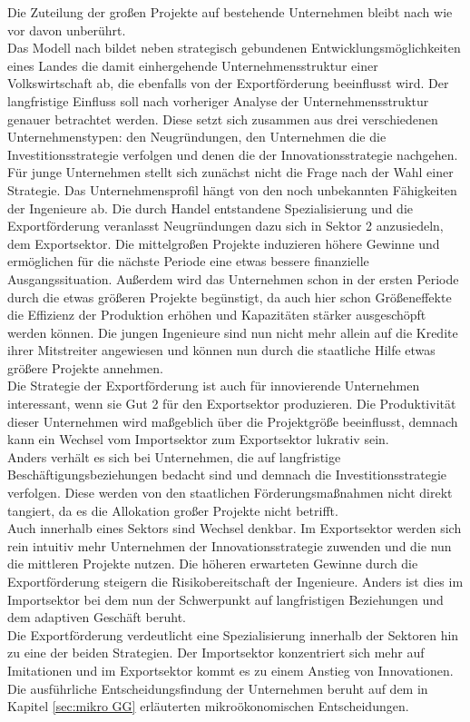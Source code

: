 Die Zuteilung der gro{\ss}en Projekte auf bestehende Unternehmen bleibt nach wie vor davon unberührt. \\
Das Modell nach \citet{Acemoglu.2006} bildet neben strategisch gebundenen Entwicklungsmöglichkeiten eines Landes die damit einhergehende Unternehmensstruktur einer Volkswirtschaft ab, die ebenfalls von der Exportförderung beeinflusst wird. Der langfristige Einfluss soll nach vorheriger Analyse der Unternehmensstruktur genauer betrachtet werden. Diese setzt sich zusammen aus drei verschiedenen Unternehmenstypen: den Neugründungen, den Unternehmen die die Investitionsstrategie verfolgen und denen die der Innovationsstrategie nachgehen.\\ 


Für junge Unternehmen stellt sich zunächst nicht die Frage nach der Wahl einer Strategie. Das Unternehmensprofil hängt von den noch unbekannten Fähigkeiten der Ingenieure ab. Die durch Handel entstandene Spezialisierung und die Exportförderung veranlasst Neugründungen dazu sich in Sektor 2 anzusiedeln, dem Exportsektor. Die mittelgro{\ss}en Projekte induzieren höhere Gewinne und ermöglichen für die nächste Periode eine etwas bessere finanzielle Ausgangssituation.
Au{\ss}erdem wird das Unternehmen schon in der ersten Periode durch die etwas grö{\ss}eren Projekte begünstigt, da auch hier schon Grö{\ss}eneffekte die Effizienz der Produktion erhöhen und Kapazitäten stärker ausgeschöpft werden können. Die jungen Ingenieure sind nun nicht mehr allein auf die Kredite ihrer Mitstreiter angewiesen und können nun durch die staatliche Hilfe etwas grö{\ss}ere Projekte annehmen.\\ 
Die Strategie der Exportförderung ist auch für innovierende Unternehmen interessant, wenn sie Gut 2 für den Exportsektor produzieren. Die Produktivität dieser Unternehmen wird ma{\ss}geblich über die Projektgrö{\ss}e beeinflusst, demnach kann ein Wechsel vom Importsektor zum Exportsektor lukrativ sein.\\ 


Anders verhält es sich bei Unternehmen, die auf langfristige Beschäftigungsbeziehungen bedacht sind und demnach die Investitionsstrategie verfolgen. Diese werden von den staatlichen Förderungsma{\ss}nahmen nicht direkt tangiert, da es die Allokation gro{\ss}er Projekte nicht betrifft.\\ 


Auch innerhalb eines Sektors sind Wechsel denkbar. Im Exportsektor werden sich rein intuitiv mehr Unternehmen der Innovationsstrategie zuwenden und die nun die mittleren Projekte nutzen. Die höheren erwarteten Gewinne durch die Exportförderung steigern die Risikobereitschaft der Ingenieure. Anders ist dies im Importsektor bei dem nun der Schwerpunkt auf langfristigen Beziehungen und dem adaptiven Geschäft beruht.\\
Die Exportförderung verdeutlicht eine Spezialisierung innerhalb der Sektoren hin zu eine der beiden Strategien. Der Importsektor konzentriert sich mehr auf Imitationen und im Exportsektor kommt es zu einem Anstieg von Innovationen. Die ausführliche Entscheidungsfindung der Unternehmen beruht auf dem in Kapitel \ref{sec:mikro GG} erläuterten mikroökonomischen Entscheidungen.

